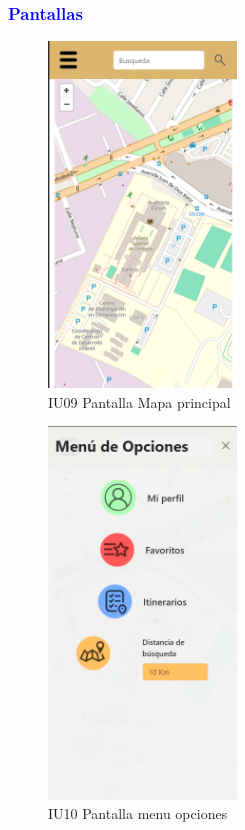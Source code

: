 \subsubsection{\textcolor{blue}{Pantallas}}
\begin{figure}[htbp]
        \centering
        \includegraphics[width= 5cm]{entregable final/pantallasSistema/IU09 Pantalla Mapa principal.png}
    \caption{IU09 Pantalla Mapa principal}
        \label{fig:enter-label}
\end{figure}
\begin{figure}[htbp]
    \centering
    \includegraphics[width= 5cm]{entregable final/pantallasSistema/IU10 Pantalla menu opciones.png}
        \caption{IU10 Pantalla menu opciones}
    \label{fig:enter-label}
\end{figure}

